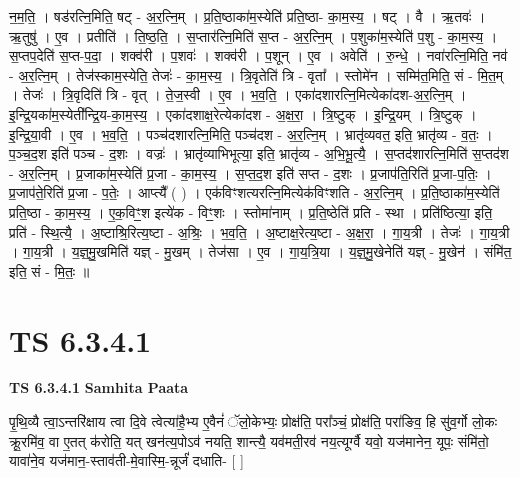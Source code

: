 \documentclass[17pt]{extarticle}
\begin{document}
न॒म॒ति॒ । षड॑रत्नि॒मिति॒ षट् - अ॒र॒त्नि॒म् । प्र॒ति॒ष्ठाका॑म॒स्येति॑ प्रति॒ष्ठा- का॒म॒स्य॒ । षट् । वै । ऋ॒तवः॑ । ऋ॒तुषु॑ । ए॒व । प्रतीति॑ । ति॒ष्ठ॒ति॒ । स॒प्तार॑त्नि॒मिति॑ स॒प्त - अ॒र॒त्नि॒म् । प॒शुका॑म॒स्येति॑ प॒शु - का॒म॒स्य॒ । स॒प्तप॒देति॑ स॒प्त-प॒दा॒ । शक्व॑री । प॒शवः॑ । शक्व॑री । प॒शून् । ए॒व । अवेति॑ । रु॒न्धे॒ । नवा॑रत्नि॒मिति॒ नव॑ - अ॒र॒त्नि॒म् । तेज॑स्काम॒स्येति॒ तेजः॑ - का॒म॒स्य॒ । त्रि॒वृतेति॑ त्रि - वृता᳚ । स्तोमे॑न । सम्मि॑त॒मिति॒ सं - मि॒त॒म् । तेजः॑ । त्रि॒वृदिति॑ त्रि - वृत् । ते॒ज॒स्वी । ए॒व । भ॒व॒ति॒ । एका॑दशारत्नि॒मित्येका॑दश-अ॒र॒त्नि॒म् । इ॒न्द्रि॒यका॑म॒स्येती᳚न्द्रि॒य-का॒म॒स्य॒ । एका॑दशाक्ष॒रेत्येका॑दश - अ॒क्ष॒रा॒ । त्रि॒ष्टुक् । इ॒न्द्रि॒यम् । त्रि॒ष्टुक् । इ॒न्द्रि॒या॒वी । ए॒व । भ॒व॒ति॒ । पञ्च॑दशारत्नि॒मिति॒ पञ्च॑दश - अ॒र॒त्नि॒म् । भ्रातृ॑व्यवत॒ इति॒ भ्रातृ॑व्य - व॒तः॒ । प॒ञ्च॒द॒श इति॑ पञ्च - द॒शः । वज्रः॑ । भ्रातृ॑व्याभिभूत्या॒ इति॒ भ्रातृ॑व्य - अ॒भि॒भू॒त्यै॒ । स॒प्तद॑शारत्नि॒मिति॑ स॒प्तद॑श - अ॒र॒त्नि॒म् । प्र॒जाका॑म॒स्येति॑ प्र॒जा - का॒म॒स्य॒ । स॒प्त॒द॒श इति॑ सप्त - द॒शः । प्र॒जाप॑ति॒रिति॑ प्र॒जा-प॒तिः॒ । प्र॒जाप॑ते॒रिति॑ प्र॒जा - प॒तेः॒ । आप्त्यै᳚ ( ) । एक॑विꣳशत्यरत्नि॒मित्येक॑विꣳशति - अ॒र॒त्नि॒म् । प्र॒ति॒ष्ठाका॑म॒स्येति॑ प्रति॒ष्ठा - का॒म॒स्य॒ । ए॒क॒विꣳ॒॒श इत्ये॑क - विꣳ॒॒शः । स्तोमा॑नाम् । प्र॒ति॒ष्ठेति॑ प्रति - स्था । प्रति॑ष्ठित्या॒ इति॒ प्रति॑ - स्थि॒त्यै॒ । अ॒ष्टाश्रि॒रित्य॒ष्टा - अ॒श्रिः॒ । भ॒व॒ति॒ । अ॒ष्टाक्ष॒रेत्य॒ष्टा - अ॒क्ष॒रा॒ । गा॒य॒त्री । तेजः॑ । गा॒य॒त्री । गा॒य॒त्री । य॒ज्ञ्॒मु॒खमिति॑ यज्ञ् - मु॒खम् । तेज॑सा । ए॒व । गा॒य॒त्रि॒या । य॒ज्ञ्॒मु॒खेनेति॑ यज्ञ् - मु॒खेन॑ । संमि॑त॒ इति॒ सं - मि॒तः॒ ॥  \newline





\section{ TS 6.3.4.1 }

\textbf{TS 6.3.4.1 } \newline
\textbf{Samhita Paata} \newline

पृ॒थि॒व्यै त्वा॒ऽन्तरि॑क्षाय त्वा दि॒वे त्वेत्या॑है॒भ्य ए॒वैनं॑ ॅलो॒केभ्यः॒ प्रोक्ष॑ति॒ परा᳚ञ्चं॒ प्रोक्ष॑ति॒ परा॑ङिव॒ हि सु॑व॒र्गो लो॒कः क्रू॒रमि॑व॒ वा ए॒तत् क॑रोति॒ यत् खन॑त्य॒पोऽव॑ नयति॒ शान्त्यै॒ यव॑मती॒रव॑ नय॒त्यूर्ग्वै यवो॒ यज॑मानेन॒ यूपः॒ संमि॑तो॒ यावा॑ने॒व यज॑मान॒-स्ताव॑ती-मे॒वास्मि॒-न्नूर्जं॑ दधाति- [  ] \newline
\end{document}
